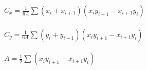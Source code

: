 \begin{huge}
  $\displaystyle C_x = \tfrac{1}{6A} \sum (x_i + x_{i+1}) (x_iy_{i+1} - x_{i+1}y_i) $ \\
  \\
  $\displaystyle C_y = \tfrac{1}{6A} \sum (y_i + y_{i+1}) (x_iy_{i+1} - x_{i+1}y_i) $ \\
  \\
  $\displaystyle A = \tfrac{1}{2} \sum (x_iy_{i+1} - x_{i+1}y_i) $ \\
\end{huge}
